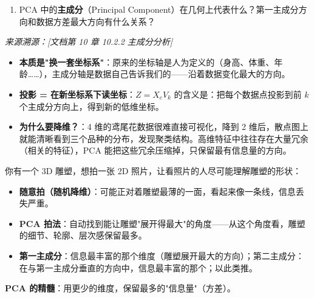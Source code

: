 \documentclass[a4paper,11pt]{ctexart}
\begin{document}
\begin{problembox}
\begin{enumerate}[(1)]
\begin{lstlisting}[language=Python]
# Step 2: SVD 分解
U, s, Vt = np.linalg.svd(X_c, full_matrices=False)

# Step 3: 降到 2 维（保留前 2 个主成分）
k = 2
Z = X_c @ Vt[:k, :].____   # 填写转置操作

# Step 4: 计算前 2 个主成分解释的方差比例
explained_ratio = (s[:k]**2).sum() / ____   # 填写分母

print(f"降维后形状: {Z.shape}")
print(f"前2个主成分解释方差比例: {explained_ratio:.2%}")
        \end{lstlisting}

        \item PCA 中的\textbf{主成分}（Principal Component）在几何上代表什么？第一主成分方向和数据方差最大方向有什么关系？
    \end{enumerate}

    \vspace{0.2cm}
    {\color{gray}\small\textit{来源溯源：[文档第 10 章 10.2.2 主成分分析]}}
\end{problembox}

\begin{beginnerbox}
    \begin{itemize}
        \item \textbf{本质是"换一套坐标系"}：原来的坐标轴是人为定义的（身高、体重、年龄……），主成分轴是数据自己告诉我们的——沿着数据变化最大的方向。
        \item \textbf{投影 = 在新坐标系下读坐标}：$Z = X_c V_k$ 的含义是：把每个数据点投影到前 $k$ 个主成分方向上，得到新的低维坐标。
        \item \textbf{为什么要降维？}：4 维的鸢尾花数据很难直接可视化，降到 2 维后，散点图上就能清晰看到三个品种的分布，发现聚类结构。高维特征中往往存在大量冗余（相关的特征），PCA 能把这些冗余压缩掉，只保留最有信息量的方向。
    \end{itemize}
\end{beginnerbox}

\begin{metaphorbox}
    你有一个 3D 雕塑，想拍一张 2D 照片，让看照片的人尽可能理解雕塑的形状：

    \begin{itemize}
        \item \textbf{随意拍（随机降维）}：可能正对着雕塑最薄的一面，看起来像一条线，信息丢失严重。
        \item \textbf{PCA 拍法}：自动找到能让雕塑"展开得最大"的角度——从这个角度看，雕塑的细节、轮廓、层次感保留最多。
        \item \textbf{第一主成分}：信息最丰富的那个维度（雕塑展开最大的方向）；第二主成分：在与第一主成分垂直的方向中，信息最丰富的那个；以此类推。
    \end{itemize}

    \textbf{PCA 的精髓}：用更少的维度，保留最多的"信息量"（方差）。
\end{metaphorbox}
\end{document}
